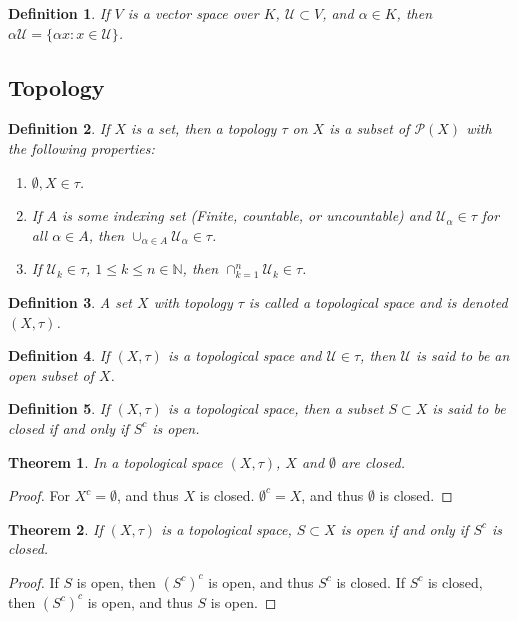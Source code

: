 \documentclass[12pt,oneside]{book}
\theoremstyle{mystyle}
\newtheorem{theorem}{Theorem}[section]
\newtheorem{definition}{Definition}[section]
\begin{document}
\begin{definition}
If $V$ is a vector space over $K$, $\mathcal{U}\subset V$, and $\alpha \in K$, then $\alpha \mathcal{U} = \{\alpha x:x\in \mathcal{U}\}$.
\end{definition}
%
\subsection{Topology}
%
\begin{definition}
If $X$ is a set, then a topology $\tau$ on $X$ is a subset of $\mathcal{P}(X)$ with the following properties:
\begin{enumerate}
\item $\emptyset, X\in \tau$.
\item If $A$ is some indexing set (Finite, countable, or uncountable) and $\mathcal{U}_\alpha \in \tau$ for all $\alpha \in A$, then $\cup_{\alpha \in A} \mathcal{U}_{\alpha} \in \tau$.
\item If $\mathcal{U}_k\in \tau$, $1\leq k \leq n\in \mathbb{N}$, then $\cap_{k=1}^{n}\mathcal{U}_k \in \tau$.
\end{enumerate}
\end{definition}

\begin{definition}
A set $X$ with topology $\tau$ is called a topological space and is denoted $(X,\tau)$.
\end{definition}

\begin{definition}
If $(X,\tau)$ is a topological space and $\mathcal{U}\in \tau$, then $\mathcal{U}$ is said to be an open subset of $X$.
\end{definition}

\begin{definition}
If $(X,\tau)$ is a topological space, then a subset $S\subset X$ is said to be closed if and only if $S^c$ is open.
\end{definition}

\begin{theorem}
In a topological space $(X,\tau)$, $X$ and $\emptyset$ are closed.
\end{theorem}
\begin{proof}
For $X^c = \emptyset$, and thus $X$ is closed. $\emptyset^c=X$, and thus $\emptyset$ is closed.
\end{proof}

\begin{theorem}
If $(X,\tau)$ is a topological space, $S\subset X$ is open if and only if $S^c$ is closed.
\end{theorem}
\begin{proof}
If $S$ is open, then $(S^c)^c$ is open, and thus $S^c$ is closed. If $S^c$ is closed, then $(S^c)^c$ is open, and thus $S$ is open.
\end{proof}
\end{document}

